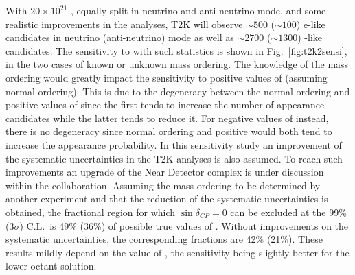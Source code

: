 With $20\times10^{21}$ \pot, equally split in neutrino and anti-neutrino mode, and some realistic improvements in the analyses, T2K will observe $\sim500$ ($\sim100$) e-like candidates in neutrino (anti-neutrino) mode as well as $\sim2700$ ($\sim1300$) \mmu-like candidates. The sensitivity to \dcp with such statistics is shown in Fig.~\ref{fig:t2k2sensi}, in the two cases of known or unknown mass ordering. The knowledge of the mass ordering would greatly impact the sensitivity to positive values of \dcp (assuming normal ordering). This is due to the degeneracy between the normal ordering and positive values of \dcp since the first tends to increase the number of \nue appearance candidates while the latter tends to reduce it. For negative values of \dcp instead, there is no degeneracy since normal ordering and positive \dcp would both tend to increase the \nue appearance probability. In this sensitivity study an improvement of the systematic uncertainties in the T2K analyses is also assumed. To reach such improvements an upgrade of the Near Detector complex is under discussion within the collaboration. Assuming the mass ordering to be determined by another experiment and that the reduction of the systematic uncertainties is obtained, the fractional region for which \(\sin\delta_{CP}=0\) can be excluded at the 99\% (3\(\sigma\)) C.L.\ is 49\% (36\%) of possible true values of \dcp. Without improvements on the systematic uncertainties, the corresponding fractions are 42$\%$ (21$\%$). These results mildly depend on the value of \stt, the sensitivity being slightly better for the lower octant solution.

